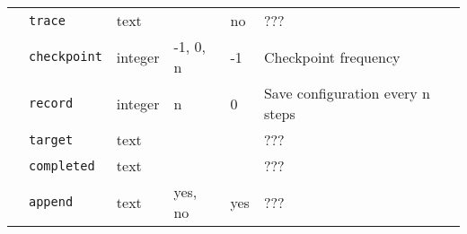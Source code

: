 \begin{table}[h]
\begin{center}
\begin{tabularx}{\linewidth}{l l l l l X }
   &   \texttt{trace}         &  text              &                  & no                & ???                      \\
   &   \texttt{checkpoint}   &  integer           &   -1, 0, n       & -1                & Checkpoint frequency \\
   &   \texttt{record}      &  integer           &   n              & 0                & Save configuration every n steps  \\
   &   \texttt{target}        &  text              &                  &                   & ???  \\
   &   \texttt{completed}     &  text              &                  &                   & ???  \\
   &   \texttt{append}        &  text              &   yes, no        & yes               & ???  \\
\hline

\end{tabularx}
\end{center}
\end{table}

